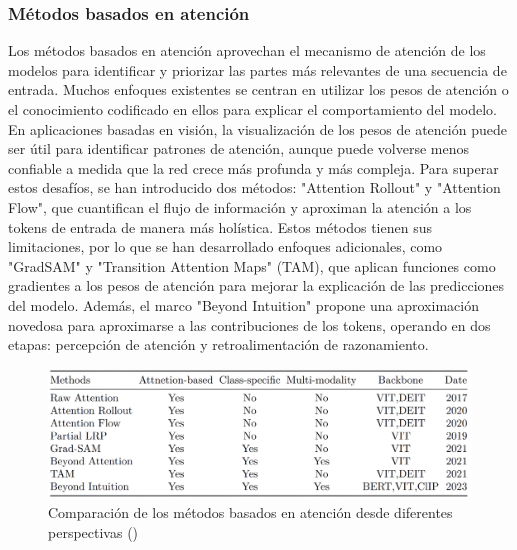    \subsubsection{ Métodos basados en atención}
  Los métodos basados en atención aprovechan el mecanismo de atención de los modelos para identificar y priorizar las partes más relevantes de una secuencia de entrada. Muchos enfoques existentes se centran en utilizar los pesos de atención o el conocimiento codificado en ellos para explicar el comportamiento del modelo. En aplicaciones basadas en visión, la visualización de los pesos de atención puede ser útil para identificar patrones de atención, aunque puede volverse menos confiable a medida que la red crece más profunda y más compleja. Para superar estos desafíos, se han introducido dos métodos: "Attention Rollout" y "Attention Flow", que cuantifican el flujo de información y aproximan la atención a los tokens de entrada de manera más holística. Estos métodos tienen sus limitaciones, por lo que se han desarrollado enfoques adicionales, como "GradSAM" y "Transition Attention Maps" (TAM), que aplican funciones como gradientes a los pesos de atención para mejorar la explicación de las predicciones del modelo. Además, el marco "Beyond Intuition" propone una aproximación novedosa para aproximarse a las contribuciones de los tokens, operando en dos etapas: percepción de atención y retroalimentación de razonamiento.
  
     \begin{figure}[H]
  	\begin{center}
  		\includegraphics[width=1\textwidth]{2/figures/vt3.jpeg}
  		\caption{ Comparación de los métodos basados en atención desde diferentes perspectivas (\cite{tecnica1})}
  	\end{center}
  \end{figure}
  
